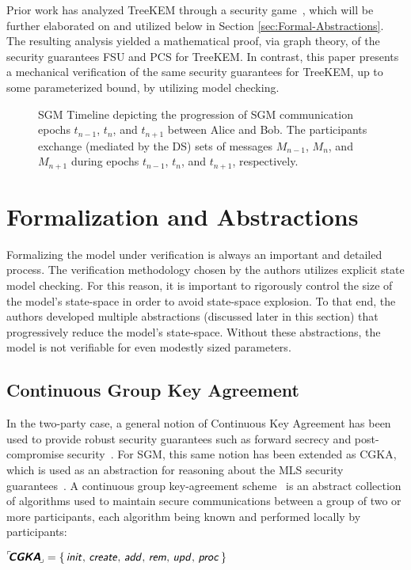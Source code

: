 \documentclass[runningheads]{llncs}
\newcommand{\Abrev}[1]{\gls{#1}}
\begin{document}
Prior work has analyzed TreeKEM through a security game~\cite{alwen2020security}, which will be further elaborated on and utilized below in Section \ref{sec:Formal-Abstractions}.
The resulting analysis yielded a mathematical proof, via graph theory, of the security guarantees \Abrev{FSU} and  \Abrev{PCS} for TreeKEM.
In contrast, this paper presents a mechanical verification of the same security guarantees for TreeKEM, up to some parameterized bound,  by utilizing model checking.


\begin{figure*}[ht!]
\centering
{}%
\caption{\Abrev{SGM} Timeline depicting the progression of \Abrev{SGM} communication epochs $t_{n-1}$, $t_{n}$, and $t_{n+1}$ between Alice and Bob. The participants exchange (mediated by the \Abrev{DS}) sets of messages $M_{n-1}$, $M_{n}$, and $M_{n+1}$ during epochs $t_{n-1}$, $t_{n}$, and $t_{n+1}$, respectively.}%
\label{fig:SGM-Timeline}%
\end{figure*}


\section{Formalization and Abstractions\label{sec:Formal-Abstractions}}

Formalizing the model under verification is always an important and detailed process.
The verification methodology chosen by the authors utilizes explicit state model checking.
For this reason, it is important to rigorously control the size of the model's state-space in order to avoid state-space explosion. 
To that end, the authors developed multiple abstractions (discussed later in this section) that progressively reduce the model's state-space. 
Without these abstractions, the model is not verifiable for even modestly sized parameters.

\subsection{Continuous Group Key Agreement\label{sec:CGKA}}
In the two-party case, a general notion of Continuous Key Agreement has been used to provide robust security guarantees such as forward secrecy and post-compromise security~\cite{perrin2013axolotl,perrin2016double,alwen2019double}.
For \Abrev{SGM}, this same notion has been extended as \Abrev{CGKA}, which is used as an abstraction for reasoning about the \Abrev{MLS} security guarantees~\cite{alwen2020security}.
A continuous group key-agreement scheme \CGKAdef\ is an abstract collection of algorithms used to maintain secure communications between a group of two or more participants, each algorithm being known and performed locally by participants:\\[2mm]
\centerline{${}^{\ulcorner}\!\!\textbf{\textsf{\textsl{CGKA}}}_{\!\lrcorner} = \left\{\,\text{\sffamily{\textsl{init}}},\, \text{\sffamily{\textsl{create}}},\, \text{\sffamily{\textsl{add}}},\, \text{\sffamily{\textsl{rem}}},\, \text{\sffamily{\textsl{upd}}},\, \text{\sffamily{\textsl{proc}}}\,\right\}$}\\[-3mm]
\end{document}
